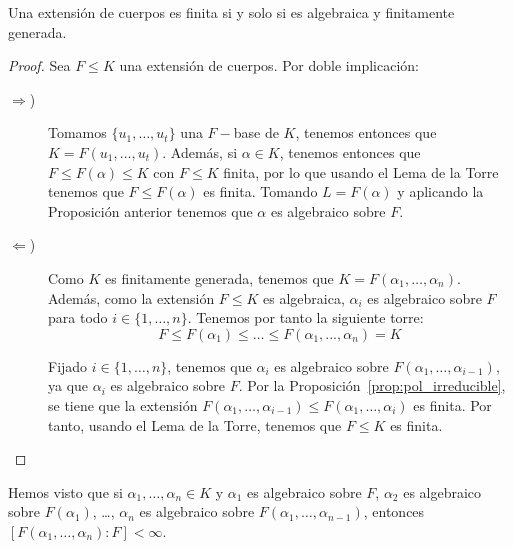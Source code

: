 \begin{teo}\label{teo:finita_algebraica}
    Una extensión de cuerpos es finita si y solo si es algebraica y finitamente generada.
    \begin{proof}
        Sea $F\leq K$ una extensión de cuerpos. Por doble implicación:
        \begin{description}
            \item [$\Longrightarrow$)] Tomamos $\{u_1, \ldots, u_t\}$ una $F-$base de $K$, tenemos entonces que $K = F(u_1, \ldots, u_t)$. Además, si $\alpha\in K$, tenemos entonces que $F\leq F(\alpha)\leq K$ con $F\leq K$ finita, por lo que usando el Lema de la Torre tenemos que $F\leq F(\alpha)$ es finita. Tomando $L = F(\alpha)$ y aplicando la Proposición anterior tenemos que $\alpha$ es algebraico sobre $F$.
            \item [$\Longleftarrow$)] Como $K$ es finitamente generada, tenemos que $K = F(\alpha_1, \ldots, \alpha_n)$. Además, como la extensión $F\leq K$ es algebraica, $\alpha_i$ es algebraico sobre $F$ para todo $i\in \{1,\ldots,n\}$. Tenemos por tanto la siguiente torre:
            \begin{equation*}
                F\leq F(\alpha_1) \leq \ldots \leq F(\alpha_1, ..., \alpha_n)=K
            \end{equation*}

            Fijado $i\in \{1,\ldots,n\}$, tenemos que $\alpha_i$ es algebraico sobre $F(\alpha_1, \ldots, \alpha_{i-1})$, ya que $\alpha_i$ es algebraico sobre $F$. Por la Proposición~\ref{prop:pol_irreducible}, se tiene que la extensión $F(\alpha_1, \ldots, \alpha_{i-1})\leq F(\alpha_1, \ldots, \alpha_i)$ es finita. Por tanto, usando el Lema de la Torre, tenemos que $F\leq K$ es finita.\qedhere
        \end{description}
    \end{proof}
\end{teo}

\begin{observacion}
    Hemos visto que si $\alpha_1, \ldots, \alpha_n\in K$ y $\alpha_1$ es algebraico sobre $F$, $\alpha_2 $ es algebraico sobre $F(\alpha_1)$, \ldots, $\alpha_n$ es algebraico sobre $F(\alpha_1, \ldots, \alpha_{n-1})$, entonces $[F(\alpha_1, \ldots, \alpha_n) : F] < \infty$.
\end{observacion}

